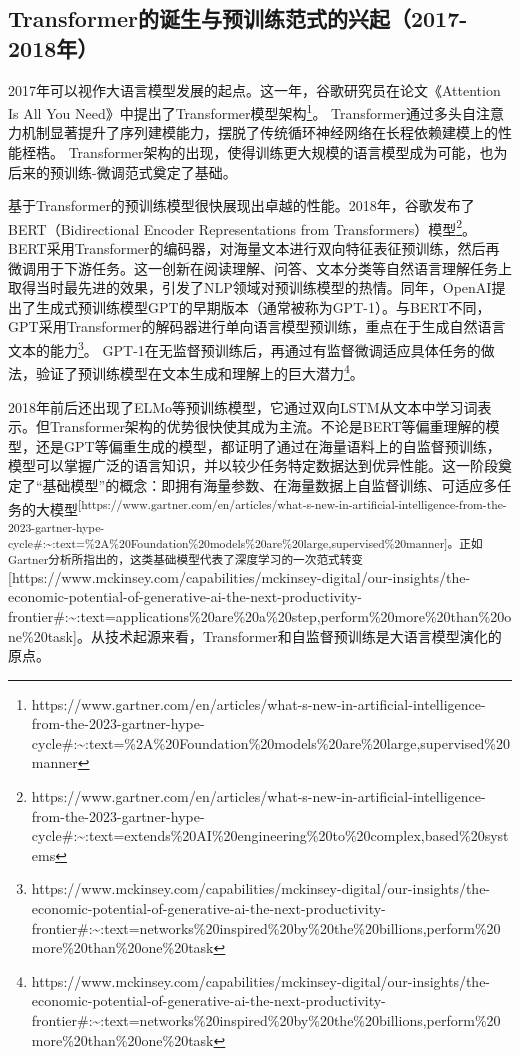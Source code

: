 \documentclass[
  letterpaper,
]{scrbook}
\begin{document}
\subsection{Transformer的诞生与预训练范式的兴起（2017-2018年）}\label{transformerux7684ux8bdeux751fux4e0eux9884ux8badux7ec3ux8303ux5f0fux7684ux5174ux8d772017-2018ux5e74}

2017年可以视作大语言模型发展的起点。这一年，谷歌研究员在论文《Attention
Is All You Need》中提出了Transformer模型架构\footnote{https://www.gartner.com/en/articles/what-s-new-in-artificial-intelligence-from-the-2023-gartner-hype-cycle\#:\textasciitilde:text=\%2A\%20Foundation\%20models\%20are\%20large,supervised\%20manner}。
Transformer通过多头自注意力机制显著提升了序列建模能力，摆脱了传统循环神经网络在长程依赖建模上的性能桎梏。
Transformer架构的出现，使得训练更大规模的语言模型成为可能，也为后来的预训练-微调范式奠定了基础。

基于Transformer的预训练模型很快展现出卓越的性能。2018年，谷歌发布了BERT（Bidirectional
Encoder Representations from Transformers）模型\footnote{https://www.gartner.com/en/articles/what-s-new-in-artificial-intelligence-from-the-2023-gartner-hype-cycle\#:\textasciitilde:text=extends\%20AI\%20engineering\%20to\%20complex,based\%20systems}。
BERT采用Transformer的编码器，对海量文本进行双向特征表征预训练，然后再微调用于下游任务。这一创新在阅读理解、问答、文本分类等自然语言理解任务上取得当时最先进的效果，引发了NLP领域对预训练模型的热情。同年，OpenAI提出了生成式预训练模型GPT的早期版本（通常被称为GPT-1）。与BERT不同，GPT采用Transformer的解码器进行单向语言模型预训练，重点在于生成自然语言文本的能力\footnote{https://www.mckinsey.com/capabilities/mckinsey-digital/our-insights/the-economic-potential-of-generative-ai-the-next-productivity-frontier\#:\textasciitilde:text=networks\%20inspired\%20by\%20the\%20billions,perform\%20more\%20than\%20one\%20task}。
GPT-1在无监督预训练后，再通过有监督微调适应具体任务的做法，验证了预训练模型在文本生成和理解上的巨大潜力\footnote{https://www.mckinsey.com/capabilities/mckinsey-digital/our-insights/the-economic-potential-of-generative-ai-the-next-productivity-frontier\#:\textasciitilde:text=networks\%20inspired\%20by\%20the\%20billions,perform\%20more\%20than\%20one\%20task}。

2018年前后还出现了ELMo等预训练模型，它通过双向LSTM从文本中学习词表示。但Transformer架构的优势很快使其成为主流。不论是BERT等偏重理解的模型，还是GPT等偏重生成的模型，都证明了通过在海量语料上的自监督预训练，模型可以掌握广泛的语言知识，并以较少任务特定数据达到优异性能。这一阶段奠定了``基础模型''的概念：即拥有海量参数、在海量数据上自监督训练、可适应多任务的大模型\textsuperscript{{[}https://www.gartner.com/en/articles/what-s-new-in-artificial-intelligence-from-the-2023-gartner-hype-cycle\#:\textasciitilde:text=\%2A\%20Foundation\%20models\%20are\%20large,supervised\%20manner{]}。正如Gartner分析所指出的，这类基础模型代表了深度学习的一次范式转变}{[}https://www.mckinsey.com/capabilities/mckinsey-digital/our-insights/the-economic-potential-of-generative-ai-the-next-productivity-frontier\#:\textasciitilde:text=applications\%20are\%20a\%20step,perform\%20more\%20than\%20one\%20task{]}。从技术起源来看，Transformer和自监督预训练是大语言模型演化的原点。
\end{document}
